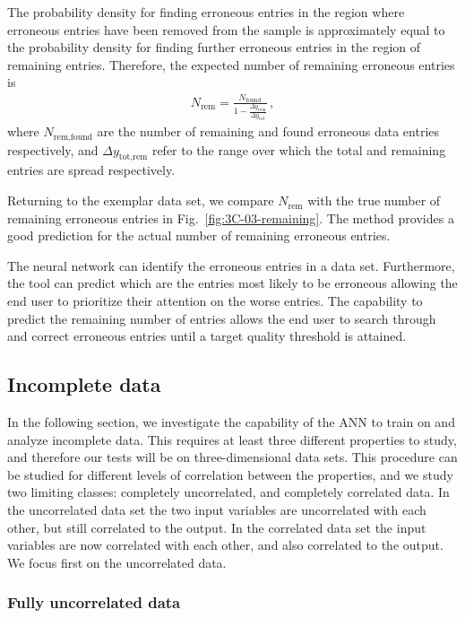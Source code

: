 \documentclass[review]{elsarticle}
\newcommand{\figref}[1]{Fig.~\ref{#1}}
\newcommand{\punc}[1]{\,#1}
\begin{document}
The probability density for finding erroneous entries in the region where
erroneous entries have been removed from the sample is approximately equal
to the probability density for finding further erroneous entries in the
region of remaining entries. Therefore, the expected number of remaining
erroneous entries is
%
\begin{align}
 N_{\textrm{rem}}
 =\frac{N_{\textrm{found}}}{1-\frac{\Delta y_{\textrm{rem}}}{\Delta y_{\textrm{tot}}}}\punc{,}
 \label{eq:rempts}
\end{align}
%
where $N_\textrm{rem,found}$ are the number of remaining and found erroneous
data entries respectively, and $\Delta y_{\textrm{tot,rem}}$ refer to the
range over which the total and remaining entries are spread respectively.

Returning to the exemplar data set, we compare $N_{\textrm{rem}}$ with the true
number of remaining erroneous entries in \figref{fig:3C-03-remaining}. The
method provides a good prediction for the actual number of remaining
erroneous entries.

The neural network can identify the erroneous entries in a data
set. Furthermore, the tool can predict which are the entries most likely to
be erroneous allowing the end user to prioritize their attention on the
worse entries. The capability to predict the remaining number of entries
allows the end user to search through and correct erroneous entries until a
target quality threshold is attained.

\subsection{Incomplete data}\label{sec:FragmentedData}

In the following section, we investigate the capability of the ANN to train
on and analyze incomplete data. This requires at least three different
properties to study, and therefore our tests will be on three-dimensional
data sets. This procedure can be studied for different levels of correlation
between the properties, and we study two limiting classes: completely
uncorrelated, and completely correlated data. In the uncorrelated data set
the two input variables are uncorrelated with each other, but still
correlated to the output.  In the correlated data set the input variables are
now correlated with each other, and also correlated to the output. We focus
first on the uncorrelated data.

\subsubsection{Fully uncorrelated data}
\end{document}

